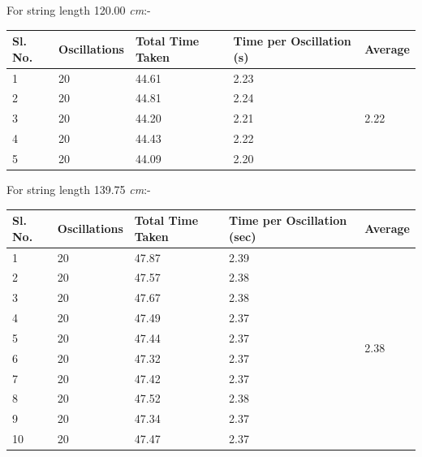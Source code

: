 \documentclass[12pt]{article}
\begin{document}
	For string length 120.00 \emph{cm}:-
	
	\begin{table}[H]
		\begin{tabular}{|l|l|l|l|l|}
			\hline
			Sl. No. & Oscillations & Total Time Taken & Time per Oscillation (s) & Average              \\ \hline
			1       & 20           & 44.61      & 2.23                     & \multirow{5}{*}{2.22} \\ \cline{1-4}
			2       & 20           & 44.81      & 2.24                     &                       \\ \cline{1-4}
			3       & 20           & 44.20      & 2.21                     &                       \\ \cline{1-4}
			4       & 20           & 44.43      & 2.22                     &                       \\ \cline{1-4}
			5       & 20           & 44.09      & 2.20                     &                       \\ \hline
		\end{tabular}
	\end{table}

	For string length 139.75 \emph{cm}:-

	\begin{table}[H]
		\begin{tabular}{|l|l|l|l|l|}
			\hline
			Sl. No. & Oscillations & Total Time Taken & Time per Oscillation (sec) & Average                \\ \hline
			1       & 20           & 47.87            & 2.39                       & \multirow{10}{*}{2.38} \\ \cline{1-4}
			2       & 20           & 47.57            & 2.38                       &                        \\ \cline{1-4}
			3       & 20           & 47.67            & 2.38                       &                        \\ \cline{1-4}
			4       & 20           & 47.49            & 2.37                       &                        \\ \cline{1-4}
			5       & 20           & 47.44            & 2.37                       &                        \\ \cline{1-4}
			6       & 20           & 47.32            & 2.37                       &                        \\ \cline{1-4}
			7       & 20           & 47.42            & 2.37                       &                        \\ \cline{1-4}
			8       & 20           & 47.52            & 2.38                       &                        \\ \cline{1-4}
			9       & 20           & 47.34            & 2.37                       &                        \\ \cline{1-4}
			10      & 20           & 47.47            & 2.37                       &                        \\ \hline
		\end{tabular}
	\end{table}
\end{document}
